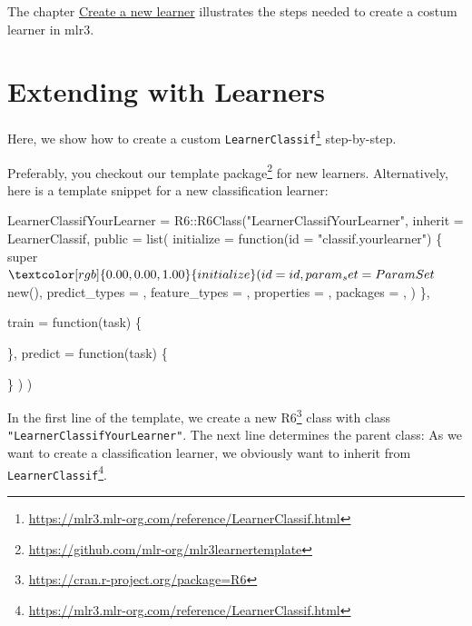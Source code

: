 \documentclass[12pt,]{scrbook}
\newenvironment{Shaded}{}{}
\newcommand{\ControlFlowTok}[1]{\textcolor[rgb]{0.00,0.00,1.00}{#1}}
\newcommand{\DataTypeTok}[1]{#1}
\newcommand{\KeywordTok}[1]{\textcolor[rgb]{0.00,0.00,1.00}{#1}}
\newcommand{\NormalTok}[1]{#1}
\newcommand{\OperatorTok}[1]{#1}
\newcommand{\StringTok}[1]{\textcolor[rgb]{0.00,0.50,0.50}{#1}}
\renewcommand{\href}[2]{#2\footnote{\url{#1}}}
\begin{document}
The chapter \protect\hyperlink{ext-learner}{Create a new learner} illustrates the steps needed to create a costum learner in mlr3.

\hypertarget{ext-learner}{%
\section{Extending with Learners}\label{ext-learner}}

Here, we show how to create a custom \href{https://mlr3.mlr-org.com/reference/LearnerClassif.html}{\texttt{LearnerClassif}} step-by-step.

Preferably, you checkout our \href{https://github.com/mlr-org/mlr3learnertemplate}{template package} for new learners.
Alternatively, here is a template snippet for a new classification learner:

\begin{Shaded}
\begin{Highlighting}[]
\NormalTok{LearnerClassifYourLearner =}\StringTok{ }\NormalTok{R6}\OperatorTok{::}\KeywordTok{R6Class}\NormalTok{(}\StringTok{"LearnerClassifYourLearner"}\NormalTok{,}
  \DataTypeTok{inherit =}\NormalTok{ LearnerClassif,}
  \DataTypeTok{public =} \KeywordTok{list}\NormalTok{(}
    \DataTypeTok{initialize =} \ControlFlowTok{function}\NormalTok{(}\DataTypeTok{id =} \StringTok{"classif.yourlearner"}\NormalTok{) \{}
\NormalTok{      super}\OperatorTok{$}\KeywordTok{initialize}\NormalTok{(}
        \DataTypeTok{id =}\NormalTok{ id,}
        \DataTypeTok{param_set =}\NormalTok{ ParamSet}\OperatorTok{$}\KeywordTok{new}\NormalTok{(),}
        \DataTypeTok{predict_types =}\NormalTok{ ,}
        \DataTypeTok{feature_types =}\NormalTok{ ,}
        \DataTypeTok{properties =}\NormalTok{ ,}
        \DataTypeTok{packages =}\NormalTok{ ,}
\NormalTok{      )}
\NormalTok{    \},}

    \DataTypeTok{train =} \ControlFlowTok{function}\NormalTok{(task) \{}

\NormalTok{    \},}
    \DataTypeTok{predict =} \ControlFlowTok{function}\NormalTok{(task) \{}

\NormalTok{    \}}
\NormalTok{  )}
\NormalTok{)}
\end{Highlighting}
\end{Shaded}

In the first line of the template, we create a new \href{https://cran.r-project.org/package=R6}{R6} class with class \texttt{"LearnerClassifYourLearner"}.
The next line determines the parent class:
As we want to create a classification learner, we obviously want to inherit from \href{https://mlr3.mlr-org.com/reference/LearnerClassif.html}{\texttt{LearnerClassif}}.
\end{document}

